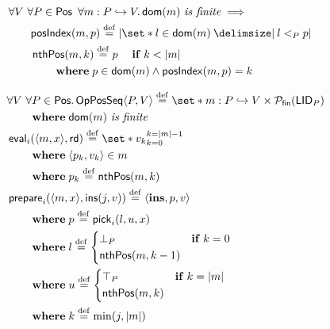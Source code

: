 \begin{align}
\MoveEqLeft \forall V \ \forall P \in \trm{Pos} \ \forall m: P \pto V \qsep \trm{dom}(m)\ \textit{is finite} \implies\\
%
&\begin{aligned}
\trm{posIndex}&(m, p) \defeq%
\card*{\set*{l \in \trm{dom}(m) \given l <_P p}}
\end{aligned}\\
%
&\begin{aligned}
\MoveEqLeft \trm{nthPos}(m, k) \defeq p \quad\when k < \card*{m}\\
&\where p \in \trm{dom}(m) \land \trm{posIndex}(m, p) = k
\end{aligned}
%
\end{align}

\begin{figure}[htb]
\begin{align}
&\begin{aligned}
\MoveEqLeft \forall V\ \forall P \in \trm{Pos} \qsep \trm{OpPosSeq}\tuple*{P, V} \defeq \set*{m:P \pto V} \times \powerfset{\trm{LID}_P}\\
&\where \trm{dom}(m)\ \textit{is finite}
\end{aligned}\\
%
&\begin{aligned}
\MoveEqLeft \trm{eval}_i(\tuple*{m, x}, \trm{rd}) \defeq \set*{v_k}_{k=0}^{k=\card*{m} - 1}\\
& \where \tuple*{p_k, v_k} \in m\\
& \where p_k \defeq \trm{nthPos}(m, k)
\end{aligned}\\
%
&\begin{aligned}
\MoveEqLeft \trm{prepare}_i(\tuple*{m,x}, \trm{ins}(j, v)) \defeq \tuple*{\textbf{ins}, p, v}\\
&\where p \defeq \trm{pick}_i(l, u, x)\\
&\where l \defeq \begin{dcases}
  \bot_P & \when k = 0\\
  \trm{nthPos}(m, k - 1) &
\end{dcases}\\
&\where u \defeq \begin{dcases}
  \top_P & \when k = \card*{m}\\
  \trm{nthPos}(m, k) &
\end{dcases}\\
&\where k \defeq \min(j, \card*{m})
\end{aligned}\\

\end{align}
\end{figure}
